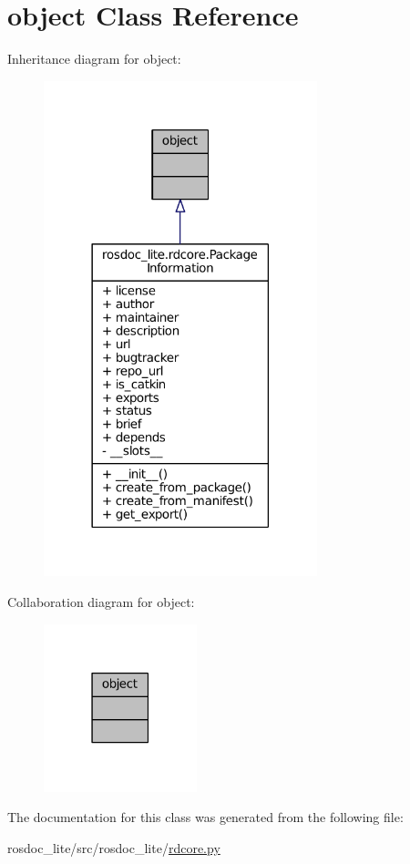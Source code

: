 \hypertarget{classobject}{}\section{object Class Reference}
\label{classobject}


Inheritance diagram for object\+:
\nopagebreak
\begin{figure}[H]
\begin{center}
\leavevmode
\includegraphics[width=225pt]{classobject__inherit__graph}
\end{center}
\end{figure}


Collaboration diagram for object\+:
\nopagebreak
\begin{figure}[H]
\begin{center}
\leavevmode
\includegraphics[width=126pt]{classobject__coll__graph}
\end{center}
\end{figure}


The documentation for this class was generated from the following file\+:\begin{DoxyCompactItemize}
\item 
rosdoc\+\_\+lite/src/rosdoc\+\_\+lite/\hyperlink{rdcore_8py}{rdcore.\+py}\end{DoxyCompactItemize}
